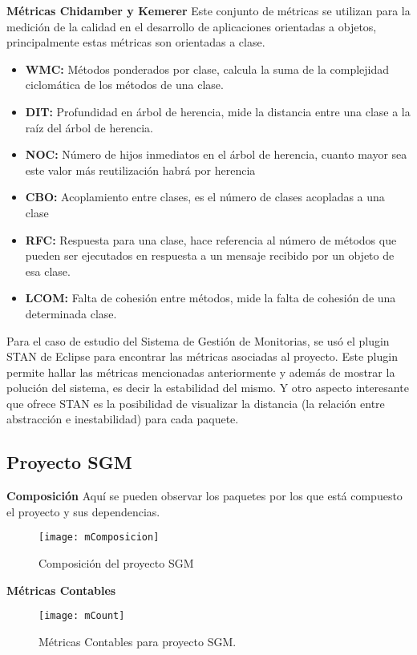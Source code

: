 \textbf{Métricas Chidamber y Kemerer}
Este conjunto de métricas se utilizan para la medición de la calidad en el desarrollo de aplicaciones orientadas a objetos, principalmente estas métricas son orientadas a clase.
\begin{itemize}[itemsep=0mm,topsep=0pt,leftmargin=0.6in]
	\item\textbf{WMC:} Métodos ponderados por clase, calcula la suma de la complejidad ciclomática de los métodos de una clase.
	\item\textbf{DIT:} Profundidad en árbol de herencia, mide la distancia entre una clase a la raíz del árbol de herencia.
	\item\textbf{NOC:} Número de hijos inmediatos en el árbol de herencia, cuanto mayor sea este valor más reutilización habrá por herencia
	\item\textbf{CBO:} Acoplamiento entre clases, es el número de clases acopladas a una clase
	\item\textbf{RFC:} Respuesta para una clase, hace referencia al número de métodos que pueden ser ejecutados en respuesta a un mensaje recibido por un objeto de esa clase. 
	\item\textbf{LCOM:} Falta de cohesión entre métodos, mide la falta de cohesión de una determinada clase.
\end{itemize}

Para el caso de estudio del Sistema de Gestión de Monitorias, se usó el plugin STAN de Eclipse para encontrar las métricas asociadas al proyecto. Este plugin permite hallar las métricas mencionadas anteriormente y además de mostrar la polución del sistema, es decir la estabilidad del mismo. Y otro aspecto interesante que ofrece STAN es la posibilidad de visualizar la distancia (la relación entre abstracción e inestabilidad) para cada paquete.

\subsection{Proyecto SGM}

\textbf{Composición}
Aquí se pueden observar los paquetes por los que está compuesto el proyecto y sus dependencias.

\begin{figure}[H]
	\centering
	\texttt{[image: mComposicion]}
	\centering
	\caption{Composición del proyecto SGM}
	\label{fig:mComposicion}
\end{figure}
\textbf{Métricas Contables}
\begin{figure}[H]
	\centering
	\texttt{[image: mCount]}
	\centering
	\caption{Métricas Contables para proyecto SGM.}
	\label{fig:mCount}
\end{figure}

